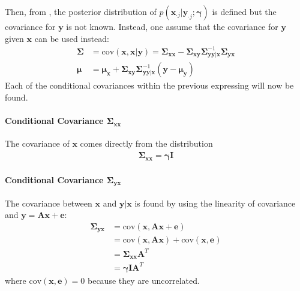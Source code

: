 Then, from \cite{conditional_cov} , the posterior distribution of $p\left( \mathbf{x}_{\cdot j} \vert \mathbf{y}_{\cdot j} ; \boldsymbol{\gamma} \right)$ is defined but the covariance for $\mathbf{y}$ is not known. Instead, one assume that the covariance for $\mathbf{y}$ given $\mathbf{x}$ can be used instead:
\begin{align*}
\boldsymbol{\Sigma} &= \text{cov}(\mathbf{x} , \mathbf{x} \vert \mathbf{y}) = \boldsymbol{\Sigma}_{\mathbf{xx}} - \boldsymbol{\Sigma}_{\mathbf{xy}} \boldsymbol{\Sigma}_{\mathbf{yy} \vert \mathbf{x}}^{-1} \boldsymbol{\Sigma}_{\mathbf{yx}} \\
\boldsymbol{\mu} &= \boldsymbol{\mu}_{\mathbf{x}} + \boldsymbol{\Sigma}_{\mathbf{xy}} \boldsymbol{\Sigma}_{\mathbf{yy} \vert \mathbf{x}}^{-1} (\mathbf{y} - \boldsymbol{\mu}_{\mathbf{y}})
\end{align*}
Each of the conditional covariances within the previous expressing will now be found.

\paragraph{Conditional Covariance $\boldsymbol{\Sigma}_{\mathbf{xx}}$}
The covariance of $\mathbf{x}$ comes directly from the distribution  
\begin{align*}
\boldsymbol{\Sigma}_{\mathbf{xx}} = \boldsymbol{\gamma} \mathbf{I}
\end{align*} 

\paragraph{Conditional Covariance $\boldsymbol{\Sigma}_{\mathbf{yx}}$}
The covariance between $\mathbf{x}$ and $\mathbf{y} \vert \mathbf{x}$ is found by using the linearity of covariance and $\mathbf{y} = \mathbf{Ax} + \mathbf{e}$:
\begin{align*}
\boldsymbol{\Sigma}_{\mathbf{yx}} &= \text{cov} \left(\mathbf{x} , \mathbf{Ax} + \mathbf{e} \right) \\ 
&= \text{cov} \left(\mathbf{x} , \mathbf{Ax} \right) + \text{cov} \left(\mathbf{x} , \mathbf{e} \right) \\
&= \boldsymbol{\Sigma}_{\mathbf{xx}} \mathbf{A}^T \\
&= \boldsymbol{\gamma} \mathbf{I} \mathbf{A}^T
\end{align*}
where $\text{cov} \left(\mathbf{x} , \mathbf{e} \right) = 0$ because they are uncorrelated.

